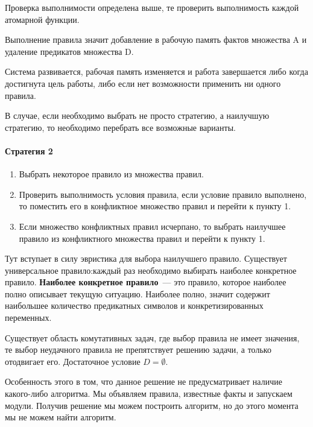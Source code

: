 Проверка выполнимости определена выше, те проверить выполнимость каждой атомарной функции. 

Выполнение правила значит добавление в рабочую память фактов множества A и удаление предикатов множества D.

Система развивается, рабочая память изменяется и работа завершается либо когда достигнута цель работы, либо если нет возможности применить ни одного правила.

В случае, если необходимо выбрать не просто стратегию, а наилучшую стратегию, то необходимо перебрать все возможные варианты.

\paragraph{Стратегия 2}
\begin{enumerate}
	\item Выбрать некоторое правило из множества правил.
	\item Проверить выполнимость условия правила, если условие правило выполнено, то поместить его в конфликтное множество правил и перейти к пункту 1.
	\item Если множество конфликтных правил исчерпано, то выбрать наилучшее правило из конфликтного множества правил и перейти к пункту 1.
\end{enumerate}

Тут вступает в силу эвристика для выбора наилучшего правило. Существует универсальное правило:каждый раз необходимо выбирать наиболее конкретное правило. \textbf{Наиболее конкретное правило}~--- это правило, которое наиболее полно описывает текущую ситуацию. Наиболее полно, значит содержит наибольшее количество предикатных символов и конкретизированных переменных. 

Существует область комутативных задач, где выбор правила не имеет значения, те выбор неудачного правила не препятствует решению задачи, а только отодвигает его. Достаточное условие $D=\emptyset$.

Особенность этого в том, что данное решение не предусматривает наличие какого-либо алгоритма. Мы объявляем правила, известные факты и запускаем модули. Получив решение мы можем построить алгоритм, но до этого момента мы не можем найти алгоритм.

